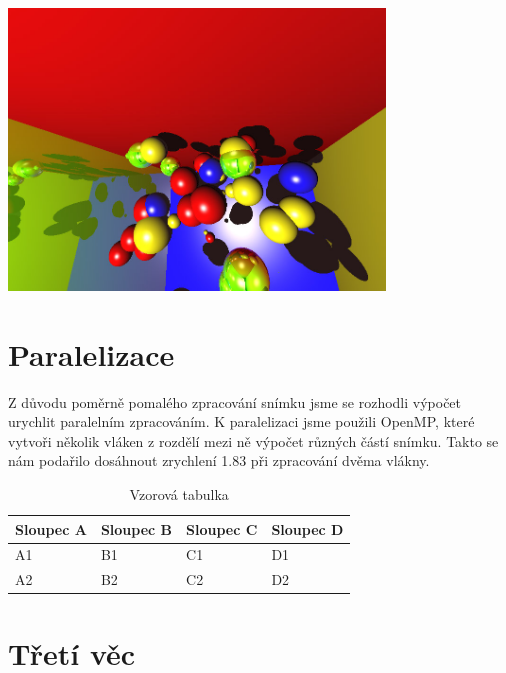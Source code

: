\documentclass[12pt,a4paper,titlepage,final]{report}
\begin{document}
\begin{center}
    \captionsetup{type=figure}
        \includegraphics[width=10cm]{images/sample.jpg}
\end{center}

\section{Paralelizace}

Z důvodu poměrně pomalého zpracování snímku jsme se rozhodli výpočet
urychlit paralelním zpracováním. K paralelizaci jsme použili OpenMP,
které vytvoři několik vláken z rozdělí mezi ně výpočet různých
částí snímku.
Takto se nám podařilo dosáhnout zrychlení 1.83 při zpracování dvěma
vlákny.

\begin{table}[h!]
    \begin{center}
    \begin{tabular}{ | p{3.5cm} | p{3.5cm} | p{3.5cm} | p{3.5cm} |}
    \hline
    Sloupec A & Sloupec B & Sloupec C & Sloupec D
    \\ \hline

    A1 & B1 & C1 & D1
    \\ \hline

    A2 & B2 & C2 & D2
    \\ \hline

    \end{tabular}
    \end{center}
    \caption{Vzorová tabulka}
\end{table}

\section{Třetí věc}
\end{document}
